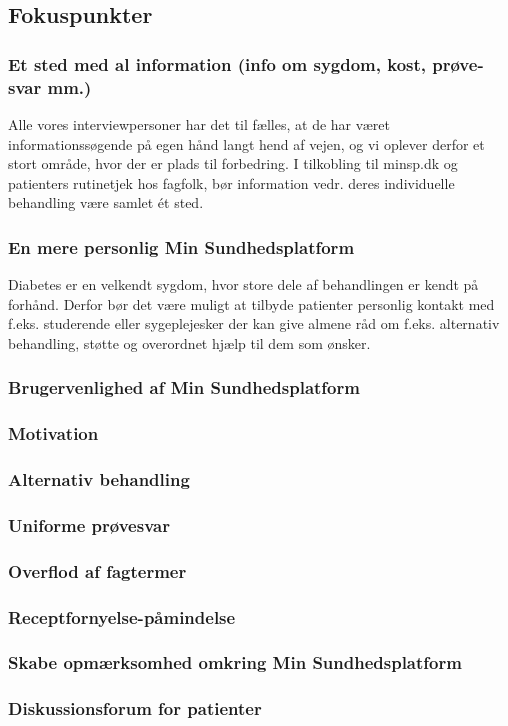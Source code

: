 \subsection{Fokuspunkter}
\subsubsection{Et sted med al information (info om sygdom, kost, prøve-svar mm.)}
Alle vores interviewpersoner har det til fælles, at de har været informationssøgende på egen hånd langt hend af vejen, og vi oplever derfor et stort område, hvor der er plads til forbedring. I tilkobling til minsp.dk og patienters rutinetjek hos fagfolk, bør information vedr. deres individuelle behandling være samlet ét sted.
\subsubsection{En mere personlig Min Sundhedsplatform}
Diabetes er en velkendt sygdom, hvor store dele af behandlingen er kendt på forhånd. Derfor bør det være muligt at tilbyde patienter personlig kontakt med f.eks. studerende eller sygeplejesker der kan give almene råd om f.eks. alternativ behandling, støtte og overordnet hjælp til dem som ønsker.
\subsubsection{Brugervenlighed af Min Sundhedsplatform}
\subsubsection{Motivation}
\subsubsection{Alternativ behandling}
\subsubsection{Uniforme prøvesvar}
\subsubsection{Overflod af fagtermer}
\subsubsection{Receptfornyelse-påmindelse}
\subsubsection{Skabe opmærksomhed omkring Min Sundhedsplatform}
\subsubsection{Diskussionsforum for patienter}


